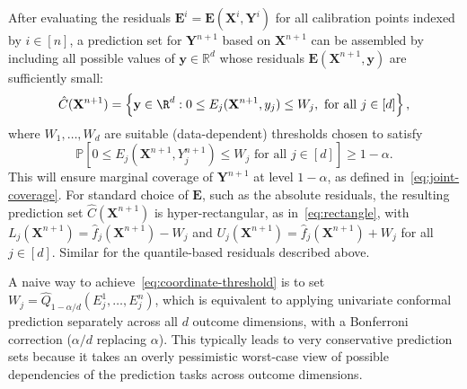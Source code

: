 After evaluating the residuals $\mathbf{E}^i = \mathbf E(\mathbf X^i, \mathbf Y^i)$ for all calibration points indexed by $i \in [n]$, a prediction set for $\mathbf{Y}^{n+1}$ based on $\mathbf{X}^{n+1}$ can be assembled by including all possible values of $\mathbf y \in \mathbb{R}^d$ whose residuals $\mathbf E(\mathbf{X}^{n+1}, \mathbf y)$ are sufficiently small:
\begin{equation}
    \hat{C}(\mathbf{X}^{n+1}) = \left\{\mathbf y \in \R^d: 0\leq E_j(\mathbf{X}^{n+1},y_j) \leq W_j, \text{ for all } j \in [d] \right\},
    \label{eq:joint-prediction}
\end{equation}
{\color{blue}where $W_1,\ldots,W_d$ are suitable (data-dependent) thresholds chosen to satisfy
\begin{equation}
    \mathbb{P} \left[0\leq E_j(\mathbf{X}^{n+1}, {Y}^{n+1}_j) \leq W_j \text{ for all } j \in [d] \right] \geq 1-\alpha.
    \label{eq:coordinate-threshold}
\end{equation}
This will ensure marginal coverage of $\mathbf{Y}^{n+1}$ at level $1-\alpha$, as defined in~\eqref{eq:joint-coverage}. For standard choice of $\mathbf E$, such as the absolute residuals, the resulting prediction set $\hat{C}(\mathbf{X}^{n+1})$ is hyper-rectangular, as in~\eqref{eq:rectangle}, with $L_j(\mathbf{X}^{n+1}) = \hat{f}_j(\mathbf{X}^{n+1}) - W_j$ and $U_j(\mathbf{X}^{n+1}) = \hat{f}_j(\mathbf{X}^{n+1}) + W_j$ for all $j \in [d]$. Similar for the quantile-based residuals described above.}

A naive way to achieve~\eqref{eq:coordinate-threshold} is to set $W_j = \hat{Q}_{1-\alpha/d}({E}^1_j, \ldots ,E^n_j)$, which is equivalent to applying univariate conformal prediction separately across all $d$ outcome dimensions, with a Bonferroni correction ($\alpha/d$ replacing $\alpha$).
This typically leads to very conservative prediction sets because it takes an overly pessimistic worst-case view of possible dependencies of the prediction tasks across outcome dimensions.


